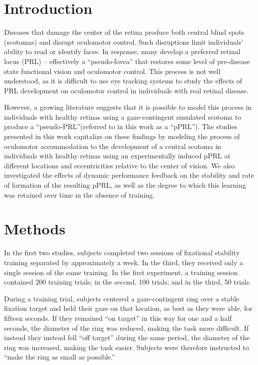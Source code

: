 
\section*{Introduction}
Diseases that damage the center of the retina produce both central blind spots (scotomas) and disrupt oculomotor control. Such disruptions limit individuals' ability to read or identify faces. In response, many  develop a preferred retinal locus (PRL) -- effectively a ``pseudo-fovea'' that restores some level of pre-disease state functional vision and oculomotor control. This process is not well understood, as it is difficult to use eye tracking systems to study the effects of PRL development on oculomotor control in individuals with real retinal disease.

However, a growing literature suggests that it is possible to model this process in individuals with healthy retinas using a gaze-contingent simulated scotoma to produce a ``pseudo-PRL''(referred to in this work as a ``pPRL''). The studies presented in this work capitalize on these findings by modeling the process of oculomotor accommodation to the development of a central scotoma in individuals with healthy retinas using an experimentally induced pPRL at different locations and eccentricities relative to the center of vision. We also investigated the effects of dynamic performance feedback on the stability and rate of formation of the resulting pPRL, as well as the degree to which this learning was retained over time in the absence of training.

\section*{Methods}
In the first two studies, subjects completed two sessions of fixational stability training separated by approximately a week. In the third, they received only a single session of the same training. In the first experiment, a training session contained 200 training trials; in the second, 100 trials; and in the third, 50 trials.

During a training trial, subjects centered a gaze-contingent ring over a stable fixation target and held their gaze on that location, as best as they were able, for fifteen seconds. If they remained ``on target'' in this way for one and a half seconds, the diameter of the ring was reduced, making the task more difficult. If instead they instead fell ``off target'' during the same period, the diameter of the ring was increased, making the task easier. Subjects were therefore instructed to ``make the ring as small as possible.''

